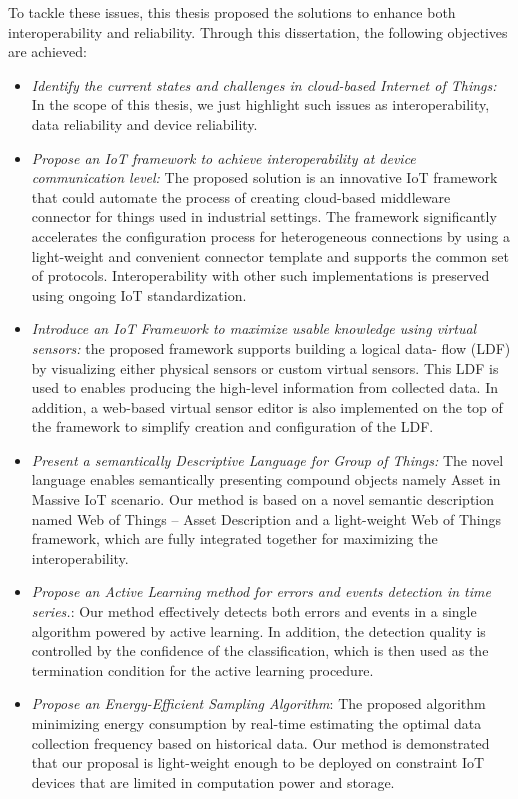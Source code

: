 To tackle these issues, this thesis proposed the solutions to enhance both interoperability and reliability. Through this dissertation, the following objectives are achieved:
\begin{itemize}
    \item \textit{Identify the current states and challenges in cloud-based Internet of Things: } In the scope of this thesis, we just highlight such issues as interoperability, data reliability and device reliability. 
    
    \item \textit{Propose an IoT framework to achieve interoperability at device communication level: } The proposed solution is an innovative IoT framework that could automate the process of creating cloud-based middleware connector for things used in industrial settings. The framework significantly accelerates the configuration process for heterogeneous connections by using a light-weight and convenient connector template and supports the common set of protocols. Interoperability with other such implementations is preserved using ongoing IoT standardization. 
    
    \item \textit{Introduce an IoT Framework to maximize usable knowledge using virtual sensors: } the proposed framework supports building a logical data- flow (LDF) by visualizing either physical sensors or custom virtual sensors. This LDF is used to enables producing the high-level information from collected data. In addition, a web-based virtual sensor editor is also implemented on the top of the framework to simplify creation and configuration of the LDF.
    
    \item \textit{Present a semantically Descriptive Language for Group of Things: } The novel language enables semantically presenting compound objects namely Asset in Massive IoT scenario. Our method is based on a novel semantic description named Web of Things – Asset Description and a light-weight Web of Things framework, which are fully integrated together for maximizing the interoperability. 
    
    \item \textit{Propose an Active Learning method for errors and events detection in time series.}:  Our method effectively detects both errors and events in a single algorithm powered by active learning. In addition, the detection quality is controlled by the confidence of the classification, which is then used as the termination condition for the active learning procedure.
    
    \item \textit{Propose an Energy-Efficient Sampling Algorithm}: The proposed algorithm minimizing energy consumption by real-time estimating the optimal data collection frequency based on historical data. Our method is demonstrated that our proposal is light-weight enough to be deployed on constraint IoT devices that are limited in computation power and storage.
    
\end{itemize}

